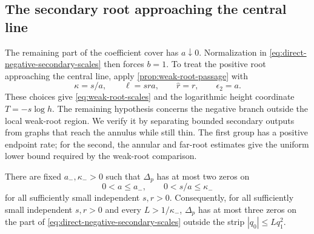 \subsection{The secondary root approaching the central line}
\label{sec:direct-negative-weak-root}

The remaining part of the coefficient cover has \(a\downarrow0\).
Normalization in \eqref{eq:direct-negative-secondary-scales} then
forces \(b=1\). To treat the positive root approaching the central
line, apply \cref{prop:weak-root-passage} with
\[
 \kappa=s/a,\qquad \ell=sra,\qquad \hat r=r,\qquad \epsilon_2=a.
\]
These choices give \eqref{eq:weak-root-scales} and the logarithmic
height coordinate \(T=-s\log h\). The remaining hypothesis concerns
the negative branch outside the local weak-root region. We verify it
by separating bounded secondary outputs from graphs that reach the
annulus while still thin. The first group has a positive endpoint
rate; for the second, the annular and far-root estimates give the
uniform lower bound required by the weak-root comparison.

\begin{proposition}
\label{prop:direct-negative-weak-root}
There are fixed \(a_-,\kappa_->0\) such that \(\Delta_p\) has at
most two zeros on
\[
 0<a\le a_-,\qquad 0<s/a\le\kappa_-
\]
for all sufficiently small independent \(s,r>0\). Consequently, for all
sufficiently small independent \(s,r>0\) and every \(L>1/\kappa_-\),
\(\Delta_p\) has at most three zeros on the part of
\eqref{eq:direct-negative-secondary-scales} outside the strip
\(|q_0|\le Lq_1^2\).
\end{proposition}

